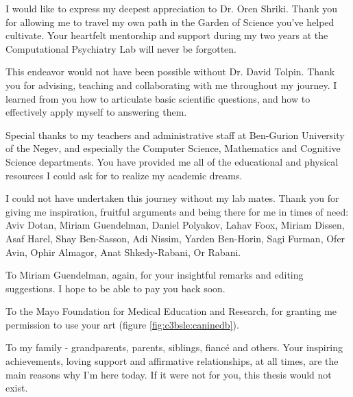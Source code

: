 

I would like to express my deepest appreciation to Dr. Oren Shriki. Thank you for allowing me to travel my own path in the Garden of Science you've helped cultivate. Your heartfelt mentorship and support during my two years at the Computational Psychiatry Lab will never be forgotten.

This endeavor would not have been possible without Dr. David Tolpin. Thank you for advising, teaching and collaborating with me throughout my journey. I learned from you how to articulate basic scientific questions, and how to effectively apply myself to answering them.

Special thanks to my teachers and administrative staff at Ben-Gurion University of the Negev, and especially the Computer Science, Mathematics and Cognitive Science departments. You have provided me all of the educational and physical resources I could ask for to realize my academic dreams.

I could not have undertaken this journey without my lab mates. Thank you for giving me inspiration, fruitful arguments and being there for me in times of need: Aviv Dotan, Miriam Guendelman, Daniel Polyakov, Lahav Foox, Miriam Dissen, Asaf Harel, Shay Ben-Sasson, Adi Nissim, Yarden Ben-Horin, Sagi Furman, Ofer Avin, Ophir Almagor, Anat Shkedy-Rabani, Or Rabani.

To Miriam Guendelman, again, for your insightful remarks and editing suggestions. I hope to be able to pay you back soon.

To the Mayo Foundation for Medical Education and Research, for granting me permission to use your art (figure \ref{fig:c3bsle:caninedb}).

To my family - grandparents, parents, siblings, fiancé and others. Your inspiring achievements, loving support and affirmative relationships, at all times, are the main reasons why I'm here today. If it were not for you, this thesis would not exist.
